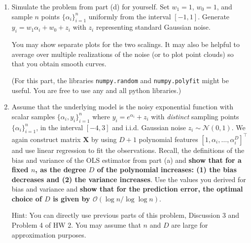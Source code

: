 \documentclass{article}\usepackage[utf8]{inputenc}\usepackage[margin=0.4cm,top=0.4cm,bottom=0.4cm]{geometry}\usepackage[usenames,dvipsnames,svgnames,table]{xcolor}
\begin{document}
\begin{enumerate}
\BeginSolution

\EndSolution
\item Simulate the problem from part (d) for yourself. Set $w_1 = 1$, $w_0 = 1$, and sample $n$ points $\{\alpha_i\}_{i=1}^n$ uniformly from the interval $[-1,1]$. Generate $y_i = w_1 \alpha_i + w_0 + z_i$ with $z_i$ representing standard Gaussian noise.
\vspace{4pt}

\vspace{4pt}

\noindent You may show separate plots for the two scalings. It may also be helpful to average over multiple realizations of the noise (or to plot point clouds) so that you obtain smooth curves.
\vspace{4pt}

\noindent (For this part, the libraries \texttt{numpy.random} and \texttt{numpy.polyfit} might be useful. You are free to use any and all python libraries.)
\BeginSolution

\EndSolution
\item Assume that the underlying model is the noisy exponential function with scalar samples $\{\alpha_i, y_i\}_{i=1}^n$ where  $y_i = e^{\alpha_i} + z_i$ with  \emph{distinct} sampling points $\{\alpha_i\}_{i=1}^n$, in the interval $[-4,3]$ and i.i.d. Gaussian noise $z_i \sim \mathcal{N}(0, 1)$. We again construct matrix $\mathbf{X}$ by using $D+1$ polynomial features $[1, \alpha_i, \ldots, \alpha_i^D]^\top$ and use linear regression to fit the observations. Recall, the definitions of the bias and variance of the OLS estimator from part (a) and {\bf show that for a fixed $n$, as the degree $D$ of the polynomial increases: (1) the bias decreases and (2) the variance increases}. Use the values you derived for bias and variance and {\bf show that for the prediction error, the optimal choice of $D$ is given by $\mathcal{O}(\log n/\log\log n)$}.
\vspace{4pt}

\noindent Hint: You can directly use previous parts of this problem, Discussion 3 and Problem 4 of HW 2. You may assume that $n$ and $D$ are large for approximation purposes.
\BeginSolution


\end{enumerate}
\end{document}
